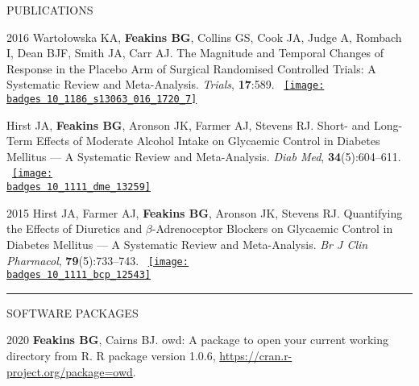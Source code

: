 \documentclass[10pt,a4paper]{article}
\def\badges{./badges/}
\begin{document}
\begin{cvlist}{PUBLICATIONS}
	\item[2016]
	Warto\l{}owska KA, \textbf{Feakins BG}, Collins GS, Cook JA, Judge A, Rombach I, Dean BJF, Smith JA, Carr AJ. The Magnitude and Temporal Changes of Response in the Placebo Arm of Surgical Randomised Controlled Trials: A Systematic Review and Meta-Analysis. \textit{Trials}, \textbf{17}:589. ~\href{https://biomedcentral.altmetric.com/details/14679542}{\texttt{[image: \\badges 10\_1186\_s13063\_016\_1720\_7]}}
	
	\item[]
	Hirst JA, \textbf{Feakins BG}, Aronson JK, Farmer AJ, Stevens RJ. Short- and Long-Term Effects of Moderate Alcohol Intake on Glycaemic Control in Diabetes Mellitus --- A Systematic Review and Meta-Analysis. \textit{Diab Med}, \textbf{34}(5):604--611. ~\href{https://wiley.altmetric.com/details/11898077}{\texttt{[image: \\badges 10\_1111\_dme\_13259]}}
	
	\item[2015]
	Hirst JA, Farmer AJ, \textbf{Feakins BG}, Aronson JK, Stevens RJ. Quantifying the Effects of Diuretics and $\beta$-Adrenoceptor Blockers on Glycaemic Control in Diabetes Mellitus --- A Systematic Review and Meta-Analysis. \textit{Br J Clin Pharmacol}, \textbf{79}(5):733--743. ~\href{https://wiley.altmetric.com/details/2869563}{\texttt{[image: \\badges 10\_1111\_bcp\_12543]}}
	
\end{cvlist}


\noindent\rule{\textwidth}{0.4pt}
\begin{cvlist}{SOFTWARE PACKAGES}
	
	\item[2020]
	\textbf{Feakins BG}, Cairns BJ. owd: A package to open your current working directory from R. R package version 1.0.6, \url{https://cran.r-project.org/package=owd}.
	
\end{cvlist}
\end{document}
